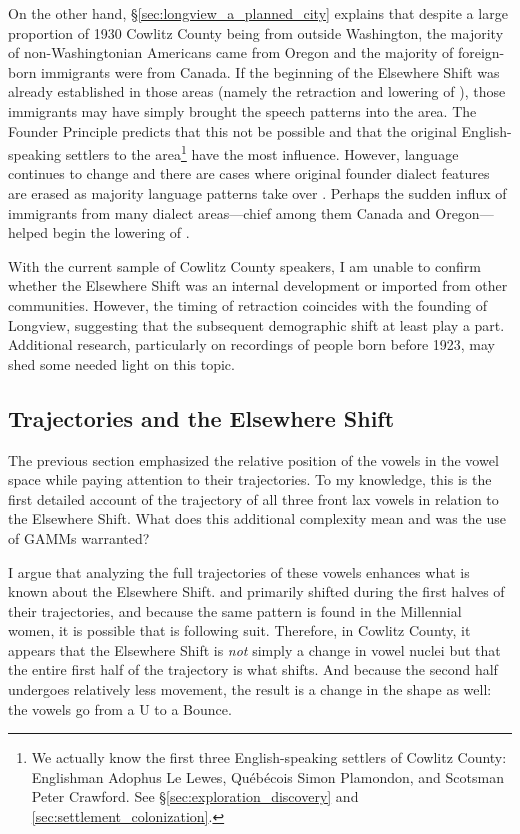 On the other hand, \S\ref{sec:longview_a_planned_city} explains that despite a large proportion of 1930 Cowlitz County being from outside Washington, the majority of non-Washingtonian Americans came from Oregon and the majority of foreign-born immigrants were from Canada. If the beginning of the Elsewhere Shift was already established in those areas (namely the retraction and lowering of \bat), those immigrants may have simply brought the speech patterns into the area. The Founder Principle \citep{zelinsky_1973, mufwene_1996} predicts that this not be possible and that the original English-speaking settlers to the area\footnote{We actually know the first three English-speaking settlers of Cowlitz County: Englishman Adophus Le Lewes, Qu{\'e}b{\'e}cois Simon Plamondon, and Scotsman Peter Crawford. See \S\ref{sec:exploration_discovery} and \ref{sec:settlement_colonization}.} have the most influence. However, language continues to change and there are cases where original founder dialect features are erased as majority language patterns take over \citep{stanford_etal_2012}. Perhaps the sudden influx of immigrants from many dialect areas---chief among them Canada and Oregon---helped begin the lowering of \trap.

With the current sample of Cowlitz County speakers, I am unable to confirm whether the Elsewhere Shift was an internal development or imported from other communities. However, the timing of \bat retraction coincides with the founding of Longview, suggesting that the subsequent demographic shift at least play a part. Additional research, particularly on recordings of people born before 1923, may shed some needed light on this topic.





\subsection{Trajectories and the Elsewhere Shift}
\label{sec:trajs_and_elsewhere_shift}

The previous section emphasized the relative position of the vowels in the vowel space while paying attention to their trajectories. To my knowledge, this is the first detailed account of the trajectory of all three front lax vowels in relation to the Elsewhere Shift. What does this additional complexity mean and was the use of GAMMs warranted?

I argue that analyzing the full trajectories of these vowels enhances what is known about the Elsewhere Shift. \bat and \bet primarily shifted during the first halves of their trajectories, and because the same pattern is found in the Millennial women, it is possible that \bit is following suit. Therefore, in Cowlitz County, it appears that the Elsewhere Shift is \textit{not} simply a change in vowel nuclei but that the entire first half of the trajectory is what shifts. And because the second half undergoes relatively less movement, the result is a change in the shape as well: the vowels go from a U to a Bounce.


